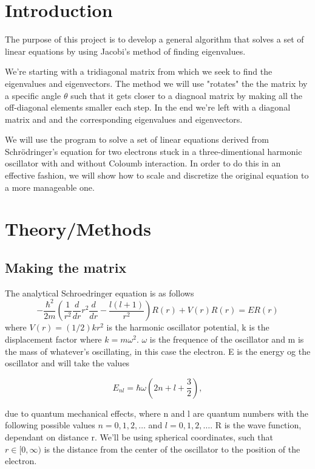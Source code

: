 \documentclass[10pt]{article}
\begin{document}
\begin{multicols}{2}


\section{Introduction}
    The purpose of this project is to develop a general algorithm that
    solves a set of linear equations by using Jacobi's method of finding
    eigenvalues. 

We're starting with a tridiagonal matrix from which we seek to find the
eigenvalues and eigenvectors. The method we will use "rotates" the the
matrix by a specific angle $\theta$ such that it gets closer to a diagnoal
matrix by making all the off-diagonal elements smaller each step. In the
end we're left with a diagonal matrix and and the corresponding eigenvalues
and eigenvectors.

We will use the program to solve a set of linear equations derived from
Schrödringer's equation for two electrons stuck in a three-dimentional
harmonic oscillator with and without Coloumb interaction. In order to do
this in an effective fashion, we will show how to scale and discretize the
original equation to a more manageable one.



\section{Theory/Methods}
\subsection{Making the matrix}
The analytical Schroedringer equation is as follows
\begin{equation*}
  -\frac{\hbar^2}{2 m} \left ( \frac{1}{r^2} \frac{d}{dr} r^2
  \frac{d}{dr} - \frac{l (l + 1)}{r^2} \right )R(r) 
     + V(r) R(r) = E R(r)
\end{equation*}
where  $V(r) = (1/2)kr^2$ is the harmonic oscillator potential, k is the
displacement factor where $k=m\omega^2$.  $\omega$ is the frequence of the
oscillator and m is the mass of whatever's oscillating, in this case the
electron. E is the energy og the oscillator and will take the values

\begin{equation*}
E_{nl}=  \hbar \omega \left(2n+l+\frac{3}{2}\right),
\end{equation*}

due to quantum mechanical effects, where n and l are quantum numbers with
the following possible values $n=0,1,2,\dots$ and $l=0,1,2,\dots$. R is the
wave function, dependant on distance r. We'll be using spherical
coordinates, such that $r\in [0,\infty)$ is the distance from the center of
the oscillator to the position of the electron.\\


\end{multicols}
\end{document}
